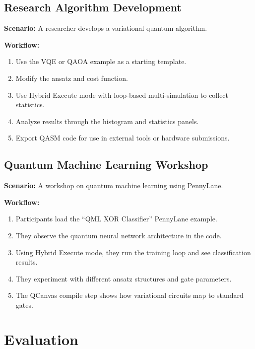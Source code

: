 \documentclass[conference]{IEEEtran}
\begin{document}
\subsection{Research Algorithm Development}

\textbf{Scenario:} A researcher develops a variational quantum algorithm.

\textbf{Workflow:}
\begin{enumerate}
    \item Use the VQE or QAOA example as a starting template.
    \item Modify the ansatz and cost function.
    \item Use Hybrid Execute mode with loop-based multi-simulation to collect statistics.
    \item Analyze results through the histogram and statistics panels.
    \item Export QASM code for use in external tools or hardware submissions.
\end{enumerate}

\subsection{Quantum Machine Learning Workshop}

\textbf{Scenario:} A workshop on quantum machine learning using PennyLane.

\textbf{Workflow:}
\begin{enumerate}
    \item Participants load the ``QML XOR Classifier'' PennyLane example.
    \item They observe the quantum neural network architecture in the code.
    \item Using Hybrid Execute mode, they run the training loop and see classification results.
    \item They experiment with different ansatz structures and gate parameters.
    \item The QCanvas compile step shows how variational circuits map to standard gates.
\end{enumerate}

\section{Evaluation}
\label{sec:evaluation}
\end{document}
